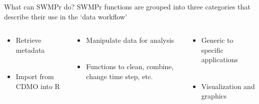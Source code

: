 \documentclass[serif]{beamer}\usepackage[]{graphicx}\usepackage[]{color}
\newcommand{\Bigtxt}[1]{\textbf{\textit{#1}}}
\begin{document}
\begin{frame}[t]{What can SWMPr do?}
SWMPr functions are grouped into three categories that describe their use in the `data workflow'
\begin{center}
\end{center}
\begin{columns}[t]
\begin{column}{0.3\textwidth}
\small{
\begin{itemize}
\item Retrieve metadata \\~\\
\item Import from CDMO into R
\end{itemize}
}
\end{column}
\begin{column}{0.3\textwidth}
\small{
\begin{itemize}
\item Manipulate data for analysis \\~\\
\item Functions to clean, combine, change time step, etc.
\end{itemize}
}
\end{column}
\begin{column}{0.3\textwidth}
\small{
\begin{itemize}
\item Generic to specific applications\\~\\
\item Visualization and graphics
\end{itemize}
}
\end{column}
\end{columns}
\end{frame}
\end{document}
